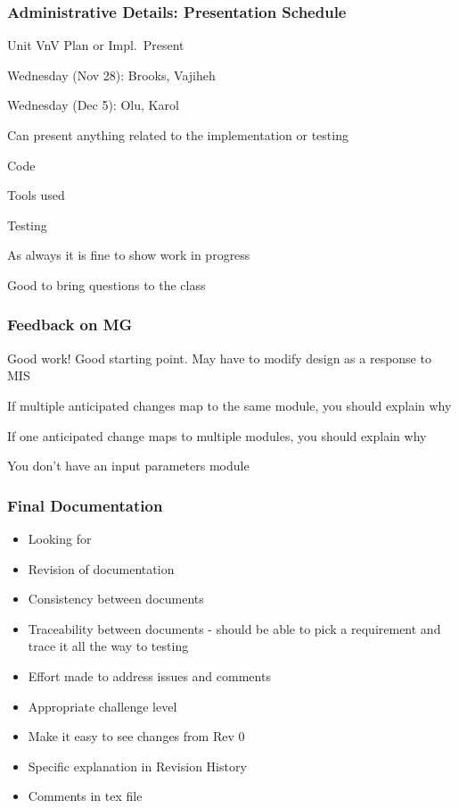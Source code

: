 \documentclass[t,12pt,numbers,fleqn]{beamer}
\begin{document}

\begin{frame}
\frametitle{Administrative Details: Presentation Schedule}

\bi
\item Unit VnV Plan or Impl.\ Present
\bi
\item Wednesday (Nov 28): Brooks, Vajiheh
\item Wednesday (Dec 5): Olu, Karol
\ei
\item Can present anything related to the implementation or testing
\bi
\item Code
\item Tools used
\item Testing
\item As always it is fine to show work in progress
\item Good to bring questions to the class
\ei
\ei

\end{frame}


\begin{frame}
\frametitle{Feedback on MG}

\bi
\item Good work!  Good starting point.  May have to modify design as a response
  to MIS
\item If multiple anticipated changes map to the same module, you should explain
  why
\item If one anticipated change maps to multiple modules, you should explain why
\item You don't have an input parameters module
\ei

\end{frame}


\begin{frame}
\frametitle{Final Documentation}
\begin{itemize}
\item Looking for 
\bi
\item Revision of documentation
\item Consistency between documents
\item Traceability between documents - should be able to pick a requirement and
  trace it all the way to testing
\item Effort made to address issues and comments
\item Appropriate challenge level
\ei
\item Make it easy to see changes from Rev 0
\bi
\item Specific explanation in Revision History
\item Comments in tex file
\ei
\end{itemize}
\end{frame}
\end{document}
